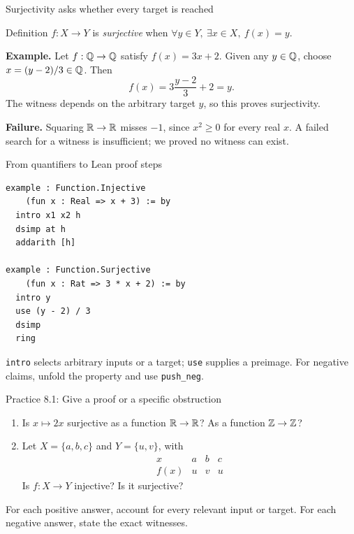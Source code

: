 \begin{frame}{Surjectivity asks whether every target is reached}
\begin{block}{Definition}
$f:X\to Y$ is \emph{surjective} when
$\forall y\in Y,\ \exists x\in X,\ f(x)=y$.
\end{block}
\textbf{Example.} Let $f:\mathbb{Q}\to\mathbb{Q}$ satisfy $f(x)=3x+2$.
Given any $y\in\mathbb{Q}$, choose $x=(y-2)/3\in\mathbb{Q}$. Then
\[
 f(x)=3\frac{y-2}{3}+2=y.
\]
The witness depends on the arbitrary target $y$, so this proves surjectivity.
\medskip

\textbf{Failure.} Squaring $\mathbb{R}\to\mathbb{R}$ misses $-1$, since $x^2\ge0$ for every real $x$.
A failed search for a witness is insufficient; we proved no witness can exist.
\end{frame}

\begin{frame}[fragile]{From quantifiers to Lean proof steps}
\begin{lstlisting}
example : Function.Injective
    (fun x : Real => x + 3) := by
  intro x1 x2 h
  dsimp at h
  addarith [h]

example : Function.Surjective
    (fun x : Rat => 3 * x + 2) := by
  intro y
  use (y - 2) / 3
  dsimp
  ring
\end{lstlisting}
\texttt{intro} selects arbitrary inputs or a target; \texttt{use} supplies a preimage.
For negative claims, unfold the property and use \texttt{push\_neg}.
\end{frame}

\begin{frame}{Practice 8.1: Give a proof or a specific obstruction}
\begin{enumerate}
\item Is $x\mapsto2x$ surjective as a function $\mathbb{R}\to\mathbb{R}$? As a function $\mathbb{Z}\to\mathbb{Z}$?
\item Let $X=\{a,b,c\}$ and $Y=\{u,v\}$, with
\[
\begin{array}{c|ccc}
x&a&b&c\\\hline
f(x)&u&v&u
\end{array}
\]
Is $f:X\to Y$ injective? Is it surjective?
\end{enumerate}
For each positive answer, account for every relevant input or target.
For each negative answer, state the exact witnesses.
\end{frame}

